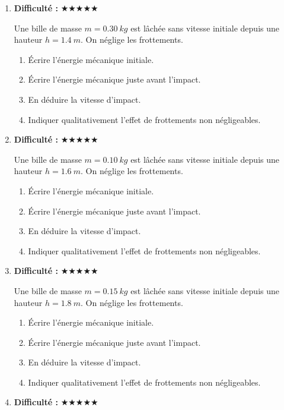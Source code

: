 \documentclass[11pt,a4paper]{article}
\newcommand{\etoiles}[1]{\textbf{Difficulté : }#1}
\begin{document}
\begin{enumerate}[label=\textbf{Exercice \arabic*.},leftmargin=*]
Une bille de masse $m=0.25\ \si{kg}$ est lâchée sans vitesse initiale depuis une hauteur $h=1.2\ \si{m}$.
On néglige les frottements.
\begin{enumerate}[label=\alph*)]
\item Écrire l'énergie mécanique initiale.
\item Écrire l'énergie mécanique juste avant l'impact.
\item En déduire la vitesse d'impact.
\item Indiquer qualitativement l'effet de frottements non négligeables.
\end{enumerate}
\item \etoiles{★★★★★}

Une bille de masse $m=0.30\ \si{kg}$ est lâchée sans vitesse initiale depuis une hauteur $h=1.4\ \si{m}$.
On néglige les frottements.
\begin{enumerate}[label=\alph*)]
\item Écrire l'énergie mécanique initiale.
\item Écrire l'énergie mécanique juste avant l'impact.
\item En déduire la vitesse d'impact.
\item Indiquer qualitativement l'effet de frottements non négligeables.
\end{enumerate}
\item \etoiles{★★★★★}

Une bille de masse $m=0.10\ \si{kg}$ est lâchée sans vitesse initiale depuis une hauteur $h=1.6\ \si{m}$.
On néglige les frottements.
\begin{enumerate}[label=\alph*)]
\item Écrire l'énergie mécanique initiale.
\item Écrire l'énergie mécanique juste avant l'impact.
\item En déduire la vitesse d'impact.
\item Indiquer qualitativement l'effet de frottements non négligeables.
\end{enumerate}
\item \etoiles{★★★★★}

Une bille de masse $m=0.15\ \si{kg}$ est lâchée sans vitesse initiale depuis une hauteur $h=1.8\ \si{m}$.
On néglige les frottements.
\begin{enumerate}[label=\alph*)]
\item Écrire l'énergie mécanique initiale.
\item Écrire l'énergie mécanique juste avant l'impact.
\item En déduire la vitesse d'impact.
\item Indiquer qualitativement l'effet de frottements non négligeables.
\end{enumerate}
\item \etoiles{★★★★★}


\end{enumerate}
\end{document}
